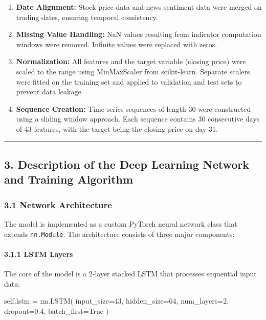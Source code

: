 \documentclass[
]{article}
\newenvironment{Shaded}{}{}
\newcommand{\DecValTok}[1]{\textcolor[rgb]{0.25,0.63,0.44}{#1}}
\newcommand{\FloatTok}[1]{\textcolor[rgb]{0.25,0.63,0.44}{#1}}
\newcommand{\NormalTok}[1]{#1}
\newcommand{\OperatorTok}[1]{\textcolor[rgb]{0.40,0.40,0.40}{#1}}
\newcommand{\VariableTok}[1]{\textcolor[rgb]{0.10,0.09,0.49}{#1}}
\begin{document}
\begin{enumerate}
\def\labelenumi{\arabic{enumi}.}
\item
  \textbf{Date Alignment:} Stock price data and news sentiment data were
  merged on trading dates, ensuring temporal consistency.
\item
  \textbf{Missing Value Handling:} NaN values resulting from indicator
  computation windows were removed. Infinite values were replaced with
  zeros.
\item
  \textbf{Normalization:} All features and the target variable (closing
  price) were scaled to the range using MinMaxScaler from scikit-learn.
  Separate scalers were fitted on the training set and applied to
  validation and test sets to prevent data leakage.
\item
  \textbf{Sequence Creation:} Time series sequences of length 30 were
  constructed using a sliding window approach. Each sequence contains 30
  consecutive days of 43 features, with the target being the closing
  price on day 31.
\end{enumerate}

\begin{center}\rule{0.5\linewidth}{0.5pt}\end{center}

\subsection{3. Description of the Deep Learning Network and Training
Algorithm}\label{3-description-of-the-deep-learning-network-and-training-algorithm}

\subsubsection{3.1 Network Architecture}\label{31-network-architecture}

The model is implemented as a custom PyTorch neural network class that
extends \texttt{nn.Module}. The architecture consists of three major
components:

\paragraph{3.1.1 LSTM Layers}\label{311-lstm-layers}

The core of the model is a 2-layer stacked LSTM that processes
sequential input data:

\begin{Shaded}
\begin{Highlighting}[]
\VariableTok{self}\NormalTok{.lstm }\OperatorTok{=}\NormalTok{ nn.LSTM(}
\NormalTok{    input\_size}\OperatorTok{=}\DecValTok{43}\NormalTok{,}
\NormalTok{    hidden\_size}\OperatorTok{=}\DecValTok{64}\NormalTok{,}
\NormalTok{    num\_layers}\OperatorTok{=}\DecValTok{2}\NormalTok{,}
\NormalTok{    dropout}\OperatorTok{=}\FloatTok{0.4}\NormalTok{,}
\NormalTok{    batch\_first}\OperatorTok{=}\VariableTok{True}
\NormalTok{)}
\end{Highlighting}
\end{Shaded}
\end{document}
